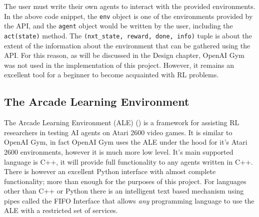 The user must write their own agents to interact with the provided environments. In the above code snippet, the \texttt{env} object is one of the environments provided by the API, and the \texttt{agent} object would be written by the user, including the \texttt{act(state)} method. The \texttt{(nxt\_state, reward, done, info)} tuple is about the extent of the information about the environment that can be gathered using the API. For this reason, as will be discussed in the Design chapter, OpenAI Gym was not used in the implementation of this project. However, it remains an excellent tool for a beginner to become acquainted with RL problems.

\subsection{The Arcade Learning Environment}
The Arcade Learning Environment (ALE) (\citet{ale-eval-plat}) is a framework for assisting RL researchers in testing AI agents on Atari 2600 video games. It is similar to OpenAI Gym, in fact OpenAI Gym uses the ALE under the hood for it's Atari 2600 environments, however it is much more low level. It's main supported language is C++, it will provide full functionality to any agents written in C++. There is however an excellent Python interface with almost complete functionality; more than enough for the purposes of this project. For languages other than C++ or Python there is an intelligent text based mechanism using pipes called the FIFO Interface that allows \textit{any} programming language to use the ALE with a restricted set of services. \paragraph{}

